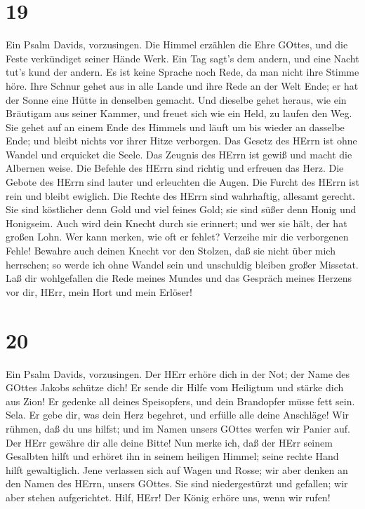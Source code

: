 \hypertarget{section-18}{%
\section{19}\label{section-18}}

 Ein Psalm Davids, vorzusingen.  Die Himmel
erzählen die Ehre GOttes, und die Feste verkündiget seiner Hände Werk.
 Ein Tag sagt's dem andern, und eine Nacht tut's kund der
andern.  Es ist keine Sprache noch Rede, da man nicht ihre
Stimme höre.  Ihre Schnur gehet aus in alle Lande und ihre
Rede an der Welt Ende; er hat der Sonne eine Hütte in denselben gemacht.
 Und dieselbe gehet heraus, wie ein Bräutigam aus seiner
Kammer, und freuet sich wie ein Held, zu laufen den Weg. 
Sie gehet auf an einem Ende des Himmels und läuft um bis wieder an
dasselbe Ende; und bleibt nichts vor ihrer Hitze verborgen. 
Das Gesetz des HErrn ist ohne Wandel und erquicket die Seele. Das
Zeugnis des HErrn ist gewiß und macht die Albernen weise. 
Die Befehle des HErrn sind richtig und erfreuen das Herz. Die Gebote des
HErrn sind lauter und erleuchten die Augen.  Die Furcht des
HErrn ist rein und bleibt ewiglich. Die Rechte des HErrn sind
wahrhaftig, allesamt gerecht.  Sie sind köstlicher denn
Gold und viel feines Gold; sie sind süßer denn Honig und Honigseim.
 Auch wird dein Knecht durch sie erinnert; und wer sie
hält, der hat großen Lohn.  Wer kann merken, wie oft er
fehlet? Verzeihe mir die verborgenen Fehle!  Bewahre auch
deinen Knecht vor den Stolzen, daß sie nicht über mich herrschen; so
werde ich ohne Wandel sein und unschuldig bleiben großer Missetat.
 Laß dir wohlgefallen die Rede meines Mundes und das
Gespräch meines Herzens vor dir, HErr, mein Hort und mein Erlöser!

\hypertarget{section-19}{%
\section{20}\label{section-19}}

 Ein Psalm Davids, vorzusingen.  Der HErr erhöre
dich in der Not; der Name des GOttes Jakobs schütze dich! 
Er sende dir Hilfe vom Heiligtum und stärke dich aus Zion! 
Er gedenke all deines Speisopfers, und dein Brandopfer müsse fett sein.
Sela.  Er gebe dir, was dein Herz begehret, und erfülle alle
deine Anschläge!  Wir rühmen, daß du uns hilfst; und im
Namen unsers GOttes werfen wir Panier auf. Der HErr gewähre dir alle
deine Bitte!  Nun merke ich, daß der HErr seinem Gesalbten
hilft und erhöret ihn in seinem heiligen Himmel; seine rechte Hand hilft
gewaltiglich.  Jene verlassen sich auf Wagen und Rosse; wir
aber denken an den Namen des HErrn, unsers GOttes.  Sie sind
niedergestürzt und gefallen; wir aber stehen aufgerichtet. 
Hilf, HErr! Der König erhöre uns, wenn wir rufen!


